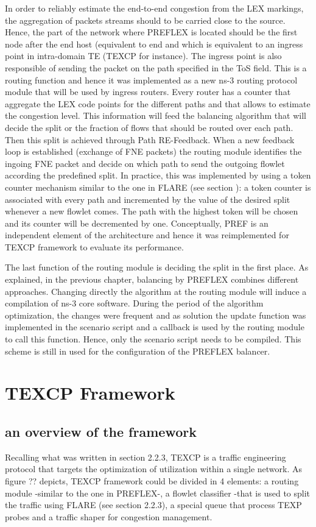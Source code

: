 In order to reliably estimate the end-to-end congestion from the LEX markings, the aggregation  of  packets streams should to be carried close to the source. Hence, the part of the network where PREFLEX is located should be the first node after the end host (equivalent to end  and which is equivalent to an ingress point in intra-domain TE (TEXCP for instance).  The ingress point is also responsible of sending the packet on the path specified in the ToS field. This is a routing function and hence it was implemented as a new ns-3 routing protocol module that will be used by ingress routers. Every router has a counter that aggregate the LEX code points for the different paths and that allows to estimate the congestion level. This information will feed the balancing algorithm that will decide the split or the fraction of flows that should be routed over each path. Then this split is achieved through Path RE-Feedback. When a new feedback loop is established (exchange of FNE packets) the routing module identifies the ingoing FNE packet and decide on which path to send the outgoing flowlet  according the predefined split. In practice, this was implemented by using a token counter mechanism similar to the one in FLARE (see section ): a token counter is associated with every path and incremented by the value of the desired split whenever a new flowlet comes. The path with the highest token will be chosen and its counter will be decremented by one. Conceptually, PREF is an independent element of the architecture and hence it was reimplemented for TEXCP framework to evaluate its performance.

The last function of the routing module is deciding the split in the first place. As explained, in the previous chapter, balancing by PREFLEX combines different approaches. Changing directly the algorithm at the routing module will induce a compilation of ns-3 core software. During the period of the algorithm optimization, the changes were frequent and as solution the update function was implemented in the scenario script and a callback is used by the routing module to call this function. Hence, only the scenario script needs to be compiled. This scheme is still in used for the configuration of the PREFLEX balancer.

\section{TEXCP Framework}
		\subsection{an overview of the framework}
 	Recalling what was written in section 2.2.3, TEXCP is a traffic engineering protocol that targets the optimization of utilization within a single network. As figure ?? depicts, TEXCP framework could be divided in 4 elements: a routing module -similar to the one in PREFLEX-, a flowlet classifier -that is used to split the traffic using FLARE (see section 2.2.3), a special queue that process TEXP probes and a traffic shaper for congestion management. 

